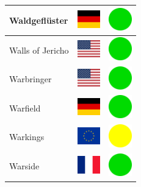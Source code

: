 \documentclass[12pt, a4paper, twoside]{report}
\begin{document}
\begin{center}
\begin{longtable}{|p{5cm}|p{2cm}|p{2cm}|}
 Waldgeflüster                                              & \includegraphics[width=1cm]{../img/flags/de} &   \includegraphics[width=1cm]{../likes/y} \\ \hline
 Walls of Jericho                                           & \includegraphics[width=1cm]{../img/flags/us} &   \includegraphics[width=1cm]{../likes/y} \\ \hline
 Warbringer                                                 & \includegraphics[width=1cm]{../img/flags/us} &   \includegraphics[width=1cm]{../likes/y} \\ \hline
 Warfield                                                   & \includegraphics[width=1cm]{../img/flags/de} &   \includegraphics[width=1cm]{../likes/y} \\ \hline
 Warkings                                                   & \includegraphics[width=1cm]{../img/flags/eu} &   \includegraphics[width=1cm]{../likes/m} \\ \hline
 Warside                                                    & \includegraphics[width=1cm]{../img/flags/fr} &   \includegraphics[width=1cm]{../likes/y} \\ \hline

\end{longtable}
\end{center}
\end{document}
